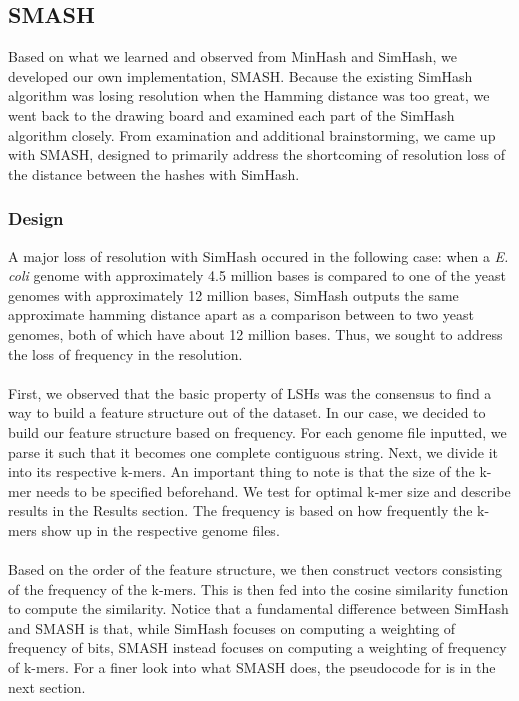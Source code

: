 \documentclass[12pt, letterpaper]{article}
\begin{document}
\subsection{SMASH}
Based on what we learned and observed from MinHash and SimHash, we developed our own implementation, SMASH. Because the existing SimHash algorithm was losing resolution when the Hamming distance was too great, we went back to the drawing board and examined each part of the SimHash algorithm closely. From examination and additional brainstorming, we came up with SMASH, designed to primarily address the shortcoming of resolution loss of the distance between the hashes with SimHash.

\subsubsection{Design}
A major loss of resolution with SimHash occured in the following case: when a \textit{E. coli} genome with approximately 4.5 million bases is compared to one of the yeast genomes with approximately 12 million bases, SimHash outputs the same approximate hamming distance apart as a comparison between to two yeast genomes, both of which have about 12 million bases. Thus, we sought to address the loss of frequency in the resolution.  \\ \\
First, we observed that the basic property of LSHs was the consensus to find a way to build a feature structure out of the dataset. In our case, we decided to build our feature structure based on frequency. For each genome file inputted, we parse it such that it becomes one complete contiguous string. Next, we divide it into its respective k-mers. An important thing to note is that the size of the k-mer needs to be specified beforehand. We test for optimal k-mer size and describe results in the Results section. The frequency is based on how frequently the k-mers show up in the respective genome files. \\ \\
Based on the order of the feature structure, we then construct vectors consisting of the frequency of the k-mers. This is then fed into the cosine similarity function to compute the similarity. Notice that a fundamental difference between SimHash and SMASH is that, while SimHash focuses on computing a weighting of frequency of bits, SMASH instead focuses on computing a weighting of frequency of k-mers. For a finer look into what SMASH does, the pseudocode for is in the next section.
\end{document}
